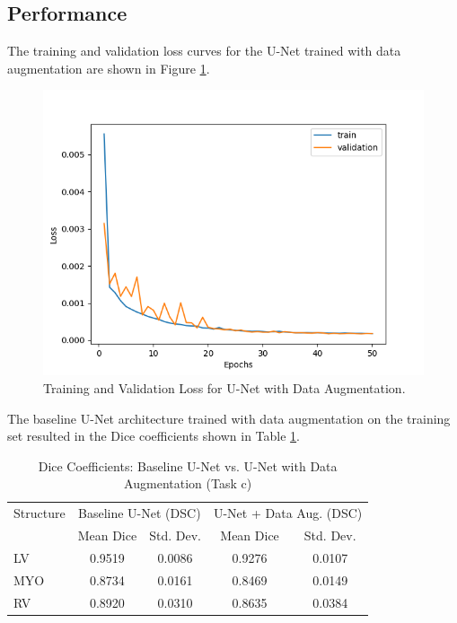 \documentclass{article}
\begin{document}
\subsection{Performance}
The training and validation loss curves for the U-Net trained with data augmentation are shown in Figure \ref{fig:data_aug_loss}.
\begin{figure}[H]
  \centering
  \includegraphics[width=0.8\linewidth]{../result/baseline_unet_data_aug.png}
  \caption{Training and Validation Loss for U-Net with Data Augmentation.}
  \label{fig:data_aug_loss}
\end{figure}

The baseline U-Net architecture trained with data augmentation on the training set resulted in the Dice coefficients shown in Table \ref{tab:data_aug_unet_comparison}.
\begin{table}[H]
  \centering
  \caption{Dice Coefficients: Baseline U-Net vs. U-Net with Data Augmentation (Task c)}
  \label{tab:data_aug_unet_comparison}
  \begin{tabular}{l|cc|cc}
    \toprule
    Structure & \multicolumn{2}{c|}{Baseline U-Net (DSC)} & \multicolumn{2}{c}{U-Net + Data Aug. (DSC)}                         \\
              & Mean Dice                                 & Std. Dev.                                   & Mean Dice & Std. Dev. \\
    \midrule
    LV        & 0.9519                                    & 0.0086                                      & 0.9276    & 0.0107    \\
    MYO       & 0.8734                                    & 0.0161                                      & 0.8469    & 0.0149    \\
    RV        & 0.8920                                    & 0.0310                                      & 0.8635    & 0.0384    \\
    \bottomrule
  \end{tabular}
\end{table}
\end{document}
